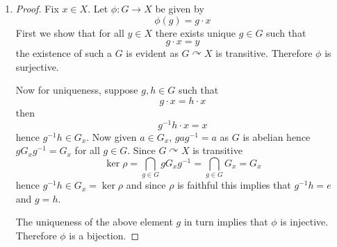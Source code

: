 \documentclass[12pt]{article}
\begin{document}
\begin{enumerate}
    \item[(c)]
    \begin{proof}
        Fix $x \in X$. Let $\phi: G \to X$ be given by
        \[ \phi(g) = g \cdot x \]
        First we show that for all $y \in X$ there exists unique $g \in G$ such that
        \[ g \cdot x = y \]
        the existence of such a $G$ is evident as $G \curvearrowright X$ is transitive.
        Therefore $\phi$ is surjective.

        Now for uniqueness, suppose $g, h \in G$ such that
        \[ g \cdot x = h \cdot x \]
        then
        \[ g^{-1}h \cdot x = x \]
        hence $g^{-1}h \in G_x$. Now given $a \in G_x$, $gag^{-1} = a$
        as $G$ is abelian hence $gG_xg^{-1} = G_x$ for all $g \in G$. Since $G \curvearrowright X$ is transitive
        \[ \ker \rho = \bigcap_{g \in G} gG_xg^{-1} = \bigcap_{g \in G}G_x = G_x \]
        hence $g^{-1}h \in G_x = \ker \rho$ and since $\rho$ is faithful this implies that
        $g^{-1}h = e$ and $g = h$.

        The uniqueness of the above element $g$ in turn implies that $\phi$ is injective.
        Therefore $\phi$ is a bijection.
    \end{proof}
\end{enumerate}
\end{document}
